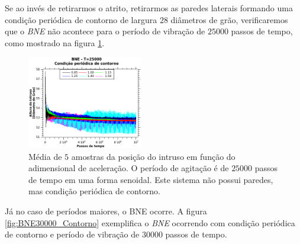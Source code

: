     Se ao invés de retirarmos o atrito, retirarmos as paredes laterais formando uma condição periódica de contorno de largura $28$ diâmetros de grão, verificaremos que o \textit{BNE} não acontece para o período de vibração de $25000$ passos de tempo, como mostrado na figura \ref{fig:BNE25000_Contorno}.

\begin{figure}
    \centering
    \includegraphics[width=0.45\textwidth]{04-figuras/BNE25000Contorno.png}
    \caption{Média de $5$ amostras da posição do intruso em função do adimensional de aceleração. O período de agitação é de $25000$ passos de tempo em uma forma senoidal. Este sistema não possui paredes, mas condição periódica de contorno.}
    \label{fig:BNE25000_Contorno}
\end{figure}

    Já no caso de períodos maiores, o BNE ocorre. A figura \ref{fig:BNE30000_Contorno} exemplifica o \textit{BNE} ocorrendo com condição periódica de contorno e período de vibração de $30000$ passos de tempo.


